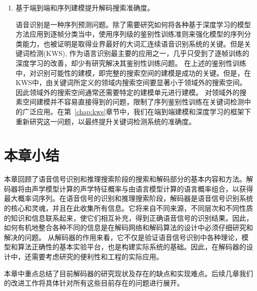 \begin{enumerate}
\item 基于端到端和序列建模提升解码搜索准确度。

语音识别是一种序列预测问题。除了需要研究如何将各种基于深度学习的模型方法应用到逐帧分类当中，使用序列级的鉴别性训练准则来强化模型的序列分类能力，也被证明是取得业界最好的大词汇连续语音识别系统的关键。但是关键词检测(KWS), 作为语言识别最主要的应用之一，几乎只受到了逐帧训练的深度学习的改善，却少有研究解决其鉴别性训练问题。
在上述的鉴别性训练中，对识别可能性的建模，即完整的搜索空间的建模是成功的关键。但是，在 KWS中，由关键词所定义的领域内搜索空间要显著小于领域外的搜索空间。因此领域外的搜索空间通常还需要特定的建模单元进行建模。
对领域外的搜素空间建模并不容易直接得到的问题，限制了序列鉴别性训练在关键词检测中的广泛应用。在第~\ref{chap:kws}章节中，我们在端到端建模和深度学习的框架下重新研究这一问题，以最终提升关键词检测系统的准确度。

\end{enumerate}
\section{本章小结}
\label{chap:intro2-sum}


本章回顾了语音信号识别和推理搜索阶段的搜索和解码部分的基本内容和方法。解码器将由声学模型计算的声学特征概率与由语言模型计算的语言概率组合，以获得最大概率词序列。在语音信号的识别和推理搜索阶段，解码器是语音信号识别系统的核心和灵魂，并且在此收集所有信息。它将来自不同来源，不同层次和不同性质的知识和信息联系起来，使它们相互补充，得到正确语音信号的识别结果。因此，如何有机地整合各种不同的信息是在解码网络和解码算法的设计中必须仔细研究和解决的问题。
从解码器的作用来看，它不仅是验证语音信号识别中各种理论，模型和算法正确性的基本实验平台，也是构建实际系统的基础。因此，在解码器的设计中，还需要考虑研究的便利性和工程的实际应用。

本章中重点总结了目前解码器的研究现状及存在的缺点和实现难点。后续几章我们的改进工作将具体针对所有这些目前存在的问题进行展开。
